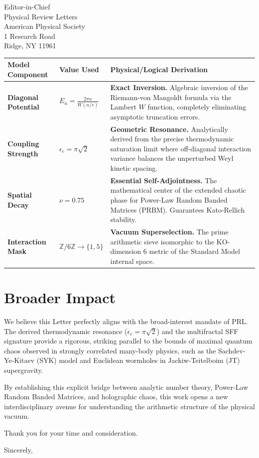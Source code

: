 \documentclass[11pt,a4paper]{letter}
\begin{document}
\begin{letter}{
    Editor-in-Chief\\
    Physical Review Letters\\
    American Physical Society\\
    1 Research Road\\
    Ridge, NY 11961
}
\vspace{0.3cm}
\begin{center}
\small
\renewcommand{\arraystretch}{1.5}
\begin{tabular}{p{} p{} p{}}
\toprule
\textbf{Model Component} & \textbf{Value Used} & \textbf{Physical/Logical Derivation} \\
\midrule
\textbf{Diagonal Potential} & $\displaystyle E_n = \frac{2\pi n}{W(n/e)}$ & \textbf{Exact Inversion.} Algebraic inversion of the Riemann-von Mangoldt formula via the Lambert $W$ function, completely eliminating asymptotic truncation errors. \\
\midrule
\textbf{Coupling Strength} & $\displaystyle \epsilon_c = \pi\sqrt{2}$ & \textbf{Geometric Resonance.} Analytically derived from the precise thermodynamic saturation limit where off-diagonal interaction variance balances the unperturbed Weyl kinetic spacing. \\
\midrule
\textbf{Spatial Decay} & $\displaystyle \nu = 0.75$ & \textbf{Essential Self-Adjointness.} The mathematical center of the extended chaotic phase for Power-Law Random Banded Matrices (PRBM). Guarantees Kato-Rellich stability. \\
\midrule
\textbf{Interaction Mask} & $\mathbb{Z}/6\mathbb{Z} \to \{1, 5\}$ & \textbf{Vacuum Superselection.} The prime arithmetic sieve isomorphic to the KO-dimension 6 metric of the Standard Model internal space. \\
\bottomrule
\end{tabular}
\end{center}
\vspace{0.3cm}

\section*{Broader Impact}

We believe this Letter perfectly aligns with the broad-interest mandate of PRL. The derived thermodynamic resonance ($\epsilon_c = \pi\sqrt{2}$) and the multifractal SFF signature provide a rigorous, striking parallel to the bounds of maximal quantum chaos observed in strongly correlated many-body physics, such as the Sachdev-Ye-Kitaev (SYK) model and Euclidean wormholes in Jackiw-Teitelboim (JT) supergravity. 

By establishing this explicit bridge between analytic number theory, Power-Law Random Banded Matrices, and holographic chaos, this work opens a new interdisciplinary avenue for understanding the arithmetic structure of the physical vacuum.

Thank you for your time and consideration.

\closing{Sincerely,}

\end{letter}
\end{document}
